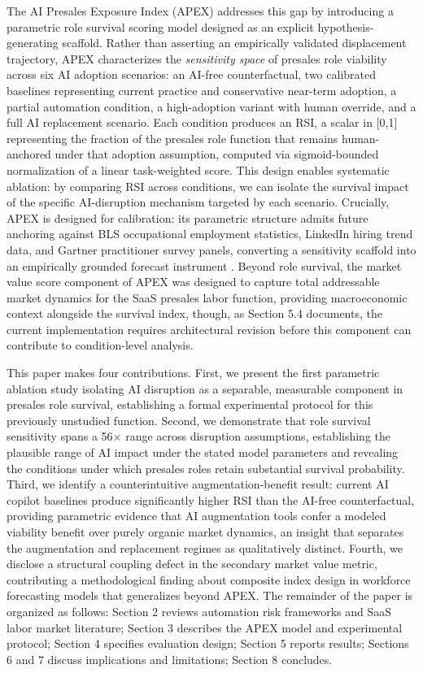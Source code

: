 \documentclass[10pt, conference]{IEEEtran}
\begin{document}
The AI Presales Exposure Index (APEX) addresses this gap by introducing a parametric role survival scoring model designed as an explicit hypothesis-generating scaffold. Rather than asserting an empirically validated displacement trajectory, APEX characterizes the \textit{sensitivity space} of presales role viability across six AI adoption scenarios: an AI-free counterfactual, two calibrated baselines representing current practice and conservative near-term adoption, a partial automation condition, a high-adoption variant with human override, and a full AI replacement scenario. Each condition produces an RSI, a scalar in [0,1] representing the fraction of the presales role function that remains human-anchored under that adoption assumption, computed via sigmoid-bounded normalization of a linear task-weighted score. This design enables systematic ablation: by comparing RSI across conditions, we can isolate the survival impact of the specific AI-disruption mechanism targeted by each scenario. Crucially, APEX is designed for calibration: its parametric structure admits future anchoring against BLS occupational employment statistics, LinkedIn hiring trend data, and Gartner practitioner survey panels, converting a sensitivity scaffold into an empirically grounded forecast instrument \cite{wiser2021expert}. Beyond role survival, the market value score component of APEX was designed to capture total addressable market dynamics for the SaaS presales labor function, providing macroeconomic context alongside the survival index, though, as Section 5.4 documents, the current implementation requires architectural revision before this component can contribute to condition-level analysis.

This paper makes four contributions. First, we present the first parametric ablation study isolating AI disruption as a separable, measurable component in presales role survival, establishing a formal experimental protocol for this previously unstudied function. Second, we demonstrate that role survival sensitivity spans a 56$\times$ range across disruption assumptions, establishing the plausible range of AI impact under the stated model parameters and revealing the conditions under which presales roles retain substantial survival probability. Third, we identify a counterintuitive augmentation-benefit result: current AI copilot baselines produce significantly higher RSI than the AI-free counterfactual, providing parametric evidence that AI augmentation tools confer a modeled viability benefit over purely organic market dynamics, an insight that separates the augmentation and replacement regimes as qualitatively distinct. Fourth, we disclose a structural coupling defect in the secondary market value metric, contributing a methodological finding about composite index design in workforce forecasting models that generalizes beyond APEX. The remainder of the paper is organized as follows: Section 2 reviews automation risk frameworks and SaaS labor market literature; Section 3 describes the APEX model and experimental protocol; Section 4 specifies evaluation design; Section 5 reports results; Sections 6 and 7 discuss implications and limitations; Section 8 concludes.
\end{document}
